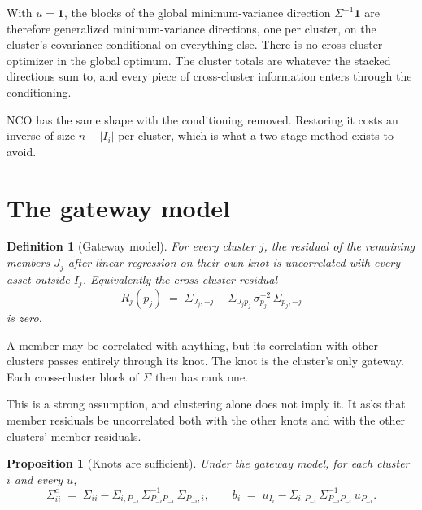 \documentclass[11pt]{article}
\newcommand{\ones}{\mathbf{1}}
\newtheorem{proposition}{Proposition}
\newtheorem{definition}{Definition}
\begin{document}
With $u=\ones$, the blocks of the global minimum-variance direction
$\Sigma^{-1}\ones$ are therefore generalized minimum-variance directions,
one per cluster, on the cluster's covariance conditional on everything
else. There is no cross-cluster optimizer in the global optimum. The
cluster totals are whatever the stacked directions sum to, and every piece
of cross-cluster information enters through the conditioning.

NCO has the same shape with the conditioning removed. Restoring it costs an
inverse of size $n-|I_i|$ per cluster, which is what a two-stage method
exists to avoid.

\section{The gateway model}

\begin{definition}[Gateway model]
For every cluster $j$, the residual of the remaining members $J_j$ after linear
regression on their own knot is uncorrelated with every asset outside
$I_j$. Equivalently the cross-cluster residual
\begin{equation}
  R_j(p_j) \;=\; \Sigma_{J_j,-j}-\Sigma_{J_j p_j}\,\sigma_{p_j}^{-2}\,\Sigma_{p_j,-j}
  \label{eq:residual}
\end{equation}
is zero.
\end{definition}

A member may be correlated with anything, but its correlation with other
clusters passes entirely through its knot. The knot is the cluster's only
gateway. Each cross-cluster block of $\Sigma$ then has rank one.

This is a strong assumption, and clustering alone does not imply it. It
asks that member residuals be uncorrelated both with the other knots and
with the other clusters' member residuals.

\begin{proposition}[Knots are sufficient]
\label{prop:sufficient}
Under the gateway model, for each cluster $i$ and every $u$,
\begin{equation}
  \Sigma^{c}_{ii}
  \;=\; \Sigma_{ii}-\Sigma_{i,P_{-i}}\,\Sigma_{P_{-i}P_{-i}}^{-1}\,\Sigma_{P_{-i},i},
  \qquad
  b_i \;=\; u_{I_i}-\Sigma_{i,P_{-i}}\,\Sigma_{P_{-i}P_{-i}}^{-1}\,u_{P_{-i}} .
  \label{eq:cheap}
\end{equation}
\end{proposition}
\end{document}
